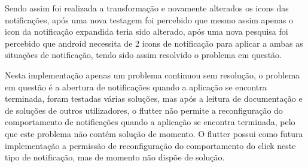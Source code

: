 Sendo assim foi realizada a transformação e novamente alterados os icons das notificações, após uma nova testagem foi percebido que mesmo assim apenas o icon da notificação expandida teria sido alterado, após uma nova pesquisa foi percebido que android necessita de 2 icons de notificação para aplicar a ambas as situações de notificação, tendo sido assim resolvido o problema em questão.

Nesta implementação apenas um problema continuou sem resolução, o problema em questão é a abertura de notificações quando a aplicação se encontra terminada, foram testadas várias soluções, mas após a leitura de documentação e de soluções de outros utilizadores, o flutter não permite a reconfiguração do comportamento de notificações quando a aplicação se encontra terminada, pelo que este problema não contém solução de momento. O flutter possui como futura implementação a permissão de reconfiguração do comportamento do click neste tipo de notificação, mas de momento não dispõe de solução.
